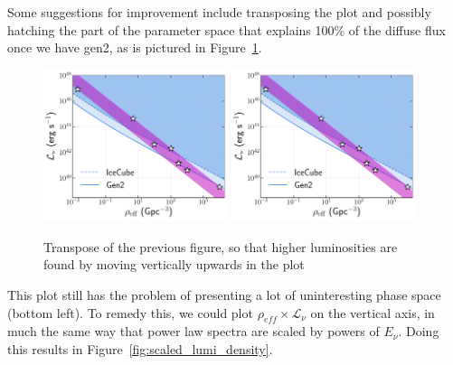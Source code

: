 Some suggestions for improvement include transposing the plot and possibly hatching the part of the parameter space that explains 100\% of the diffuse flux once we have gen2, as is pictured in Figure~\ref{fig:transposed}.

\begin{figure}[htb]
    \centering
    \includegraphics[width=0.48\textwidth]{images/lumi_density_rotated.pdf}
    \includegraphics[width=0.48\textwidth]{images/lumi_density_hatched_rotated.pdf}
    \caption{Transpose of the previous figure, so that higher luminosities are found by moving vertically upwards in the plot}
    \label{fig:transposed}
\end{figure}

This plot still has the problem of presenting a lot of uninteresting phase space (bottom left). To remedy this, we could plot $\rho_{eff}\times \mathcal{L}_{\nu}$ on the vertical axis, in much the same way that power law spectra are scaled by powers of $E_{\nu}$. Doing this results in Figure~\ref{fig:scaled_lumi_density}.

